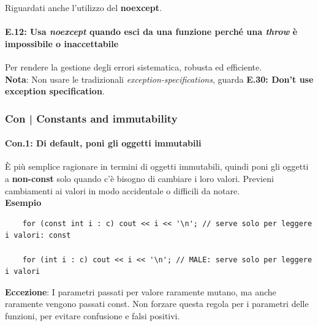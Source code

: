 \textsf{\small Riguardati anche l'utilizzo del \textbf{noexcept}.} \\

\paragraph{E.12: Usa \emph{noexcept} quando esci da una funzione perché una \emph{throw} è impossibile o inaccettabile}

\textsf{\small Per rendere la gestione degli errori sistematica, robusta ed efficiente.} \\

\textsf{\small \textbf{Nota}: Non usare le tradizionali \emph{exception-specifications}, guarda \textbf{E.30: Don't use exception specification}.} \\

\break


\subsubsection{Con | Constants and immutability}

\paragraph{Con.1: Di default, poni gli oggetti immutabili}

\textsf{\small È più semplice ragionare in termini di oggetti immutabili, quindi poni gli oggetti a \textbf{non-const} solo quando c'è bisogno di cambiare i loro valori. Previeni cambiamenti ai valori in modo accidentale o difficili da notare. } \\

\textsf{\small \textbf{Esempio}}

\begin{lstlisting}
	for (const int i : c) cout << i << '\n'; // serve solo per leggere i valori: const
	
	for (int i : c) cout << i << '\n'; // MALE: serve solo per leggere i valori
\end{lstlisting}

\textsf{\small \textbf{Eccezione}: I parametri passati per valore raramente mutano, ma anche raramente vengono passati const. Non forzare questa regola per i parametri delle funzioni, per evitare confusione e falsi positivi.} \\

